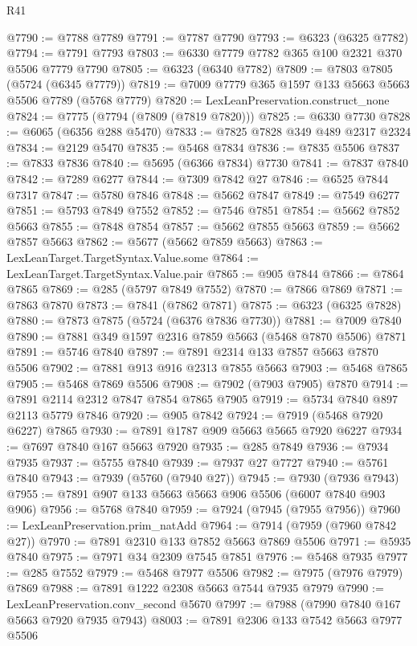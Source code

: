 \begin{lexlean}{R41}
\begin{coremodule}
@7790 := @7788 @7789
@7791 := @7787 @7790
@7793 := @6323 (@6325 @7782)
@7794 := @7791 @7793
@7803 := @6330 @7779 @7782 @365 @100 @2321 @370 @5506 @7779 @7790
@7805 := @6323 (@6340 @7782)
@7809 := @7803 @7805 (@5724 (@6345 @7779))
@7819 := @7009 @7779 @365 @1597 @133 @5663 @5663 @5506 @7789 (@5768 @7779)
@7820 := LexLeanPreservation.construct_none
@7824 := @7775 (@7794 (@7809 (@7819 @7820)))
@7825 := @6330 @7730
@7828 := @6065 (@6356 @288 @5470)
@7833 := @7825 @7828 @349 @489 @2317 @2324
@7834 := @2129 @5470
@7835 := @5468 @7834
@7836 := @7835 @5506
@7837 := @7833 @7836
@7840 := @5695 (@6366 @7834) @7730
@7841 := @7837 @7840
@7842 := @7289 @6277
@7844 := @7309 @7842 @27
@7846 := @6525 @7844 @7317
@7847 := @5780 @7846
@7848 := @5662 @7847
@7849 := @7549 @6277
@7851 := @5793 @7849 @7552
@7852 := @7546 @7851
@7854 := @5662 @7852 @5663
@7855 := @7848 @7854
@7857 := @5662 @7855 @5663
@7859 := @5662 @7857 @5663
@7862 := @5677 (@5662 @7859 @5663)
@7863 := LexLeanTarget.TargetSyntax.Value.some
@7864 := LexLeanTarget.TargetSyntax.Value.pair
@7865 := @905 @7844
@7866 := @7864 @7865
@7869 := @285 (@5797 @7849 @7552)
@7870 := @7866 @7869
@7871 := @7863 @7870
@7873 := @7841 (@7862 @7871)
@7875 := @6323 (@6325 @7828)
@7880 := @7873 @7875 (@5724 (@6376 @7836 @7730))
@7881 := @7009 @7840
@7890 := @7881 @349 @1597 @2316 @7859 @5663 (@5468 @7870 @5506) @7871
@7891 := @5746 @7840
@7897 := @7891 @2314 @133 @7857 @5663 @7870 @5506
@7902 := @7881 @913 @916 @2313 @7855 @5663
@7903 := @5468 @7865
@7905 := @5468 @7869 @5506
@7908 := @7902 (@7903 @7905) @7870
@7914 := @7891 @2114 @2312 @7847 @7854 @7865 @7905
@7919 := @5734 @7840 @897 @2113 @5779 @7846
@7920 := @905 @7842
@7924 := @7919 (@5468 @7920 @6227) @7865
@7930 := @7891 @1787 @909 @5663 @5665 @7920 @6227
@7934 := @7697 @7840 @167 @5663 @7920
@7935 := @285 @7849
@7936 := @7934 @7935
@7937 := @5755 @7840
@7939 := @7937 @27 @7727
@7940 := @5761 @7840
@7943 := @7939 (@5760 (@7940 @27))
@7945 := @7930 (@7936 @7943)
@7955 := @7891 @907 @133 @5663 @5663 @906 @5506 (@6007 @7840 @903 @906)
@7956 := @5768 @7840
@7959 := @7924 (@7945 (@7955 @7956))
@7960 := LexLeanPreservation.prim_natAdd
@7964 := @7914 (@7959 (@7960 @7842 @27))
@7970 := @7891 @2310 @133 @7852 @5663 @7869 @5506
@7971 := @5935 @7840
@7975 := @7971 @34 @2309 @7545 @7851
@7976 := @5468 @7935
@7977 := @285 @7552
@7979 := @5468 @7977 @5506
@7982 := @7975 (@7976 @7979) @7869
@7988 := @7891 @1222 @2308 @5663 @7544 @7935 @7979
@7990 := LexLeanPreservation.conv_second @5670
@7997 := @7988 (@7990 @7840 @167 @5663 @7920 @7935 @7943)
@8003 := @7891 @2306 @133 @7542 @5663 @7977 @5506

\end{coremodule}
\end{lexlean}
